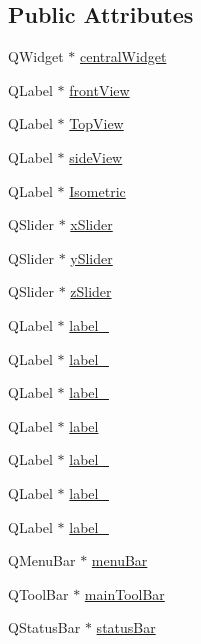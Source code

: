 \subsection*{Public Attributes}
\begin{DoxyCompactItemize}
\item 
Q\+Widget $\ast$ \mbox{\hyperlink{class_ui___main_window_a30075506c2116c3ed4ff25e07ae75f81}{central\+Widget}}
\item 
Q\+Label $\ast$ \mbox{\hyperlink{class_ui___main_window_aaa3be6280852dd7414487d8eb8721875}{front\+View}}
\item 
Q\+Label $\ast$ \mbox{\hyperlink{class_ui___main_window_a08f0e8760c217ff420264da666f5e394}{Top\+View}}
\item 
Q\+Label $\ast$ \mbox{\hyperlink{class_ui___main_window_a663b4718d0dc688c9db703da0be7f795}{side\+View}}
\item 
Q\+Label $\ast$ \mbox{\hyperlink{class_ui___main_window_a337da439425ad2b604103c6d32532012}{Isometric}}
\item 
Q\+Slider $\ast$ \mbox{\hyperlink{class_ui___main_window_a55d1e4c09e7e91bd7af09c2c4c977014}{x\+Slider}}
\item 
Q\+Slider $\ast$ \mbox{\hyperlink{class_ui___main_window_ae74bb4b335829fb5f768c924a0037c6d}{y\+Slider}}
\item 
Q\+Slider $\ast$ \mbox{\hyperlink{class_ui___main_window_a90a5538b9dc26379fc236f7856f7cd02}{z\+Slider}}
\item 
Q\+Label $\ast$ \mbox{\hyperlink{class_ui___main_window_ad6bab8fb8903b8f41afea1218ee52695}{label\+\_}}
\item 
Q\+Label $\ast$ \mbox{\hyperlink{class_ui___main_window_a663f728e6244926a795c6e6892673b1d}{label\+\_}}
\item 
Q\+Label $\ast$ \mbox{\hyperlink{class_ui___main_window_a13936e6f18b1c90402b3c7a3c92b6cdb}{label\+\_}}
\item 
Q\+Label $\ast$ \mbox{\hyperlink{class_ui___main_window_ad9c89133780f28e6efa2ec17ceb9cff5}{label}}
\item 
Q\+Label $\ast$ \mbox{\hyperlink{class_ui___main_window_a2e2516d755e4dd53fc905dabddf2738a}{label\+\_}}
\item 
Q\+Label $\ast$ \mbox{\hyperlink{class_ui___main_window_a0376fd90247280e7c7957cc70628708c}{label\+\_}}
\item 
Q\+Label $\ast$ \mbox{\hyperlink{class_ui___main_window_a78c7e10730b43c6700cd7216911ed76a}{label\+\_}}
\item 
Q\+Menu\+Bar $\ast$ \mbox{\hyperlink{class_ui___main_window_a2be1c24ec9adfca18e1dcc951931457f}{menu\+Bar}}
\item 
Q\+Tool\+Bar $\ast$ \mbox{\hyperlink{class_ui___main_window_a5172877001c8c7b4e0f6de50421867d1}{main\+Tool\+Bar}}
\item 
Q\+Status\+Bar $\ast$ \mbox{\hyperlink{class_ui___main_window_a50fa481337604bcc8bf68de18ab16ecd}{status\+Bar}}
\end{DoxyCompactItemize}


